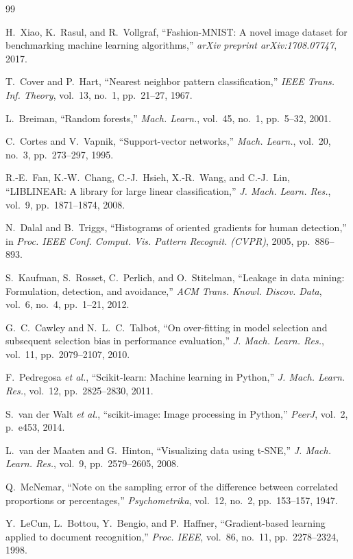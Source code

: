 \documentclass[conference]{IEEEtran}
\begin{document}
\begin{thebibliography}{99}

H.~Xiao, K.~Rasul, and R.~Vollgraf, ``Fashion-MNIST: A novel image dataset for benchmarking machine learning
algorithms,'' \emph{arXiv preprint arXiv:1708.07747}, 2017.

T.~Cover and P.~Hart, ``Nearest neighbor pattern classification,'' \emph{IEEE Trans. Inf. Theory}, vol.~13, no.~1,
pp.~21--27, 1967.

L.~Breiman, ``Random forests,'' \emph{Mach. Learn.}, vol.~45, no.~1, pp.~5--32, 2001.

C.~Cortes and V.~Vapnik, ``Support-vector networks,'' \emph{Mach. Learn.}, vol.~20, no.~3, pp.~273--297, 1995.

R.-E.~Fan, K.-W.~Chang, C.-J.~Hsieh, X.-R.~Wang, and C.-J.~Lin, ``LIBLINEAR: A library for large linear
classification,'' \emph{J. Mach. Learn. Res.}, vol.~9, pp.~1871--1874, 2008.

N.~Dalal and B.~Triggs, ``Histograms of oriented gradients for human detection,'' in \emph{Proc. IEEE Conf. Comput.
Vis. Pattern Recognit. (CVPR)}, 2005, pp.~886--893.

S.~Kaufman, S.~Rosset, C.~Perlich, and O.~Stitelman, ``Leakage in data mining: Formulation, detection, and avoidance,''
\emph{ACM Trans. Knowl. Discov. Data}, vol.~6, no.~4, pp.~1--21, 2012.

G.~C.~Cawley and N.~L.~C.~Talbot, ``On over-fitting in model selection and subsequent selection bias in performance
evaluation,'' \emph{J. Mach. Learn. Res.}, vol.~11, pp.~2079--2107, 2010.

F.~Pedregosa \emph{et al.}, ``Scikit-learn: Machine learning in Python,'' \emph{J. Mach. Learn. Res.}, vol.~12,
pp.~2825--2830, 2011.

S.~van der Walt \emph{et al.}, ``scikit-image: Image processing in Python,'' \emph{PeerJ}, vol.~2, p.~e453, 2014.

L.~van der Maaten and G.~Hinton, ``Visualizing data using t-SNE,'' \emph{J. Mach. Learn. Res.}, vol.~9,
pp.~2579--2605, 2008.

Q.~McNemar, ``Note on the sampling error of the difference between correlated proportions or percentages,''
\emph{Psychometrika}, vol.~12, no.~2, pp.~153--157, 1947.

Y.~LeCun, L.~Bottou, Y.~Bengio, and P.~Haffner, ``Gradient-based learning applied to document recognition,''
\emph{Proc. IEEE}, vol.~86, no.~11, pp.~2278--2324, 1998.

\end{thebibliography}
\end{document}

